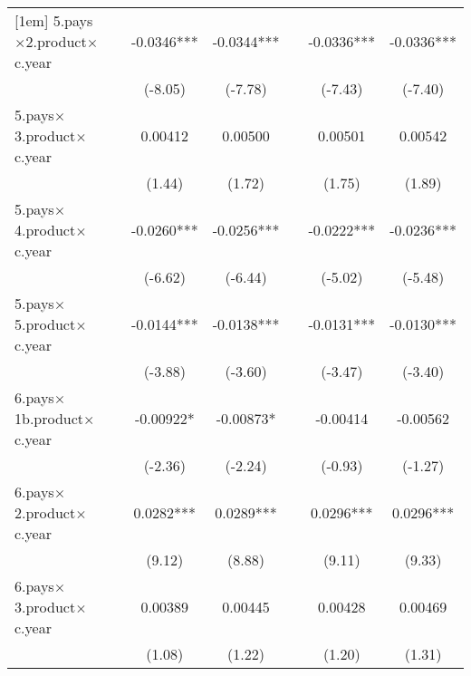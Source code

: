 {\begin{tabular}{l*{6}{c}}
[1em]
5.pays$\times$2.product$\times$c.year&                     &     -0.0346***&     -0.0344***&                     &     -0.0336***&     -0.0336***\\
                    &                     &     (-8.05)         &     (-7.78)         &                     &     (-7.43)         &     (-7.40)         \\
[1em]
5.pays$\times$3.product$\times$c.year&                     &     0.00412         &     0.00500         &                     &     0.00501         &     0.00542         \\
                    &                     &      (1.44)         &      (1.72)         &                     &      (1.75)         &      (1.89)         \\
[1em]
5.pays$\times$4.product$\times$c.year&                     &     -0.0260***&     -0.0256***&                     &     -0.0222***&     -0.0236***\\
                    &                     &     (-6.62)         &     (-6.44)         &                     &     (-5.02)         &     (-5.48)         \\
[1em]
5.pays$\times$5.product$\times$c.year&                     &     -0.0144***&     -0.0138***&                     &     -0.0131***&     -0.0130***\\
                    &                     &     (-3.88)         &     (-3.60)         &                     &     (-3.47)         &     (-3.40)         \\
[1em]
6.pays$\times$1b.product$\times$c.year&                     &    -0.00922*  &    -0.00873*  &                     &    -0.00414         &    -0.00562         \\
                    &                     &     (-2.36)         &     (-2.24)         &                     &     (-0.93)         &     (-1.27)         \\
[1em]
6.pays$\times$2.product$\times$c.year&                     &      0.0282***&      0.0289***&                     &      0.0296***&      0.0296***\\
                    &                     &      (9.12)         &      (8.88)         &                     &      (9.11)         &      (9.33)         \\
[1em]
6.pays$\times$3.product$\times$c.year&                     &     0.00389         &     0.00445         &                     &     0.00428         &     0.00469         \\
                    &                     &      (1.08)         &      (1.22)         &                     &      (1.20)         &      (1.31)         \\

\end{tabular}}
